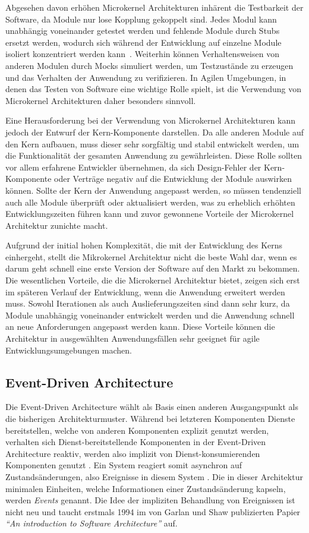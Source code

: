 \documentclass[acmtog]{acmart}
\begin{document}
Abgesehen davon erhöhen Microkernel Architekturen inhärent die Testbarkeit der Software, da Module nur lose Kopplung gekoppelt sind.
Jedes Modul kann unabhängig voneinander getestet werden und fehlende Module durch Stubs ersetzt werden, wodurch sich während der Entwicklung auf einzelne Module isoliert konzentriert werden kann~\cite[26]{architecturePatterns}.
Weiterhin können Verhaltensweisen von anderen Modulen durch Mocks simuliert werden, um Testzustände zu erzeugen und das Verhalten der Anwendung zu verifizieren.
In Agilen Umgebungen, in denen das Testen von Software eine wichtige Rolle spielt, ist die Verwendung von Microkernel Architekturen daher besonders sinnvoll.

Eine Herausforderung bei der Verwendung von Microkernel Architekturen kann jedoch der Entwurf der Kern-Komponente darstellen.
Da alle anderen Module auf den Kern aufbauen, muss dieser sehr sorgfältig und stabil entwickelt werden, um die Funktionalität der gesamten Anwendung zu gewährleisten.
Diese Rolle sollten vor allem erfahrene Entwickler übernehmen, da sich Design-Fehler der Kern-Komponente oder Verträge negativ auf die Entwicklung der Module auswirken können.
Sollte der Kern der Anwendung angepasst werden, so müssen tendenziell auch alle Module überprüft oder aktualisiert werden, was zu erheblich erhöhten Entwicklungszeiten führen kann und zuvor gewonnene Vorteile der Microkernel Architektur zunichte macht.

Aufgrund der initial hohen Komplexität, die mit der Entwicklung des Kerns einhergeht, stellt die Mikrokernel Architektur nicht die beste Wahl dar, wenn es darum geht schnell eine erste Version der Software auf den Markt zu bekommen.
Die wesentlichen Vorteile, die die Microkernel Architektur bietet, zeigen sich erst im späteren Verlauf der Entwicklung, wenn die Anwendung erweitert werden muss.
Sowohl Iterationen als auch Auslieferungszeiten sind dann sehr kurz, da Module unabhängig voneinander entwickelt werden und die Anwendung schnell an neue Anforderungen angepasst werden kann.
Diese Vorteile können die Architektur in ausgewählten Anwendungsfällen sehr geeignet für agile Entwicklungsumgebungen machen.

\subsection{Event-Driven Architecture}
Die Event-Driven Architecture wählt als Basis einen anderen Ausgangspunkt als die bisherigen Architekturmuster.
Während bei letzteren Komponenten Dienste bereitstellen, welche von anderen Komponenten explizit genutzt werden,
verhalten sich Dienst-bereitstellende Komponenten in der Event-Driven Architecture reaktiv,
werden also implizit von Dienst-konsumierenden Komponenten genutzt \cite{garlanShawImplizit}.
Ein System reagiert somit asynchron auf Zustandsänderungen, also Ereignisse in diesem System \cite{eda}.
Die in dieser Architektur minimalen Einheiten, welche Informationen einer Zustandsänderung kapseln, werden \textit{Events} genannt.
Die Idee der impliziten Behandlung von Ereignissen ist nicht neu und taucht erstmals 1994 im von Garlan und Shaw publizierten Papier
\textit{\enquote{An introduction to Software Architecture}} auf.
\end{document}
